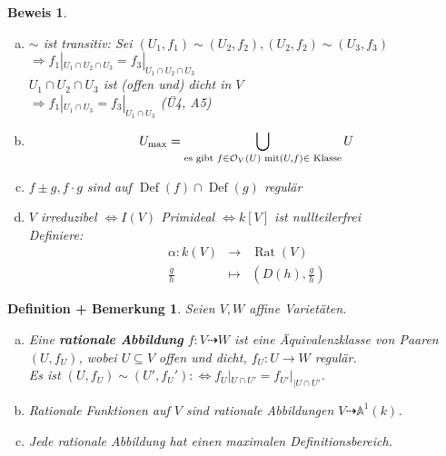 \documentclass[a4paper,12pt]{report}
\theoremstyle{break}
\newtheorem{DefBem}[Def]{Definition + Bemerkung}
\theoremstyle{nonumberbreak}
\newtheorem{Bew}{Beweis}
\theoremstyle{nonumberplain}
\newcommand{\emp}[1]{\textbf{\emph{#1}}}
\newcommand{\begriff}[1]{{\index{#1}}\emp{#1}}
\DeclareMathOperator{\Ddef}{Def}%
\DeclareMathOperator{\Rat}{Rat}
\newcommand{\calO}{\mathcal{O}}
\begin{document}
\begin{Bew}\begin{enumerate}[a)]
\item
	$\sim$ ist transitiv: Sei $(U_1,f_1)\sim(U_2,f_2), (U_2,f_2)\sim(U_3,f_3)$\\
	$\Rightarrow f_1|_{U_1\cap U_2\cap U_3}=f_3|_{U_1\cap U_2\cap U_3}$\\
	$U_1\cap U_2 \cap U_3$ ist (offen und) \emph{dicht} in $V$\\
	$\Rightarrow f_1|_{U_1\cap U_3} = f_3|_{U_1\cap U_3}$ (\"U4, A5)
\item
	\[U_{\max}=\bigcup_{\textrm{es gibt }f\in \calO_V(U)\\ \textrm{ mit} (U,f)\in \textrm{ Klasse}} U\]
\item
	$f\pm g, f\cdot g$ sind auf $\Ddef(f)\cap\Ddef(g)$ regul\"ar
\item
	$V$ irreduzibel $\Leftrightarrow I(V)$ Primideal $\Leftrightarrow k[V]$ ist nullteilerfrei\\
	Definiere:\[\begin{array}{rcl}
		\alpha:k(V) &\to& \Rat(V)\\
		\frac{g}{h} &\mapsto& (D(h),\frac{g}{h})\end{array}\]
	\end{enumerate}\end{Bew}

\begin{DefBem}\label{bem7.2}
Seien $V,W$ affine Variet\"aten.\begin{enumerate}[a)]
\item
	Eine \begriff{rationale Abbildung} $f:V\dashrightarrow W$ ist eine \"Aquivalenzklasse von Paaren $(U,f_U)$, wobei $U\subseteq V$ offen und dicht, $f_U:U\longrightarrow W$ regul\"ar.\\
	Es ist $(U,f_U)\sim (U',f_U'):\Leftrightarrow f_U|_{U\cap U'}=f_{U'}|_{\vert U\cap U'}$.
\item
	Rationale Funktionen auf $V$ sind rationale Abbildungen $V\dashrightarrow \mathbb A^1(k)$.
\item
	Jede rationale Abbildung hat einen maximalen Definitionsbereich.
\end{enumerate}\end{DefBem}
\end{document}
